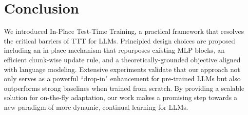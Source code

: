 \section{Conclusion}
We introduced In-Place Test-Time Training, a practical framework that resolves the critical barriers of TTT for LLMs. Principled design choices are proposed including an in-place mechanism that repurposes existing MLP blocks, an efficient chunk-wise update rule, and a theoretically-grounded objective aligned with language modeling. Extensive experiments validate that our approach not only serves as a powerful ``drop-in" enhancement for pre-trained LLMs but also outperforms strong baselines when trained from scratch. By providing a scalable solution for on-the-fly adaptation, our work makes a promising step towards a new paradigm of more dynamic, continual learning for LLMs.